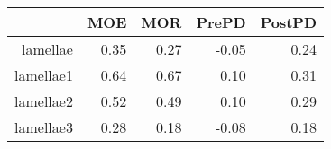 \begin{table}[ht]
\centering
\caption{} 
\begin{tabular}{rrrrr}
  \hline
 & MOE & MOR & PrePD & PostPD \\ 
  \hline
lamellae & 0.35 & 0.27 & -0.05 & 0.24 \\ 
  lamellae1 & 0.64 & 0.67 & 0.10 & 0.31 \\ 
  lamellae2 & 0.52 & 0.49 & 0.10 & 0.29 \\ 
  lamellae3 & 0.28 & 0.18 & -0.08 & 0.18 \\ 
   \hline
\end{tabular}
\end{table}
